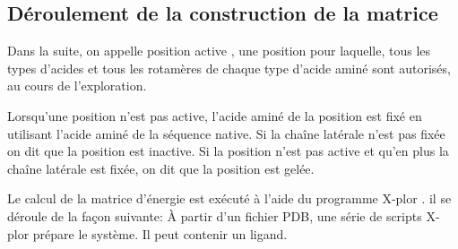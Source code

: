 \subsection{Déroulement de la construction de la matrice}
\label{sub:matrix}

Dans la suite, on appelle position active , une position pour laquelle, tous les types d'acides et tous les rotamères de chaque type d'acide aminé sont autorisés, au cours de l'exploration.

Lorsqu'une position n'est pas active, l'acide aminé de la position est fixé en utilisant l'acide aminé de la séquence native. Si la chaîne latérale n'est pas fixée on dit que la position est inactive. Si la position n'est pas active et qu'en plus la chaîne latérale est fixée, on dit que la position est gelée.

Le calcul de la matrice d'énergie est exécuté à l'aide du programme X-plor \cite{Brünger92}. il se déroule de la façon suivante:
À partir d'un fichier PDB, une série de scripts X-plor prépare le système. Il peut contenir un ligand.

